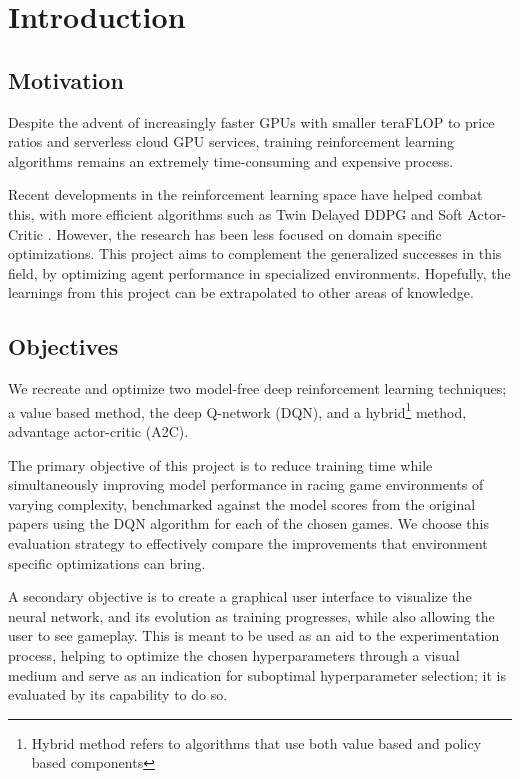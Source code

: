\chapter{Introduction}

\section{Motivation}
Despite the advent of increasingly faster GPUs with smaller teraFLOP to price
ratios and serverless cloud GPU services, training reinforcement learning
algorithms remains an extremely time-consuming and expensive process.

Recent developments in the reinforcement learning space have helped combat
this, with more efficient algorithms such as Twin Delayed DDPG
\cite{fujimoto2018addressing} and Soft Actor-Critic \cite{haarnoja2018soft}.
However, the research has been less focused on domain specific optimizations.
This project aims to complement the generalized successes in this field, by
optimizing agent performance in specialized environments. Hopefully, the
learnings from this project can be extrapolated to other areas of knowledge.

\section{Objectives}

We recreate and optimize two model-free deep reinforcement learning techniques;
a value based method, the deep Q-network (DQN), and a hybrid\footnote{Hybrid
  method refers to algorithms that use both value based and policy based
  components} method, advantage actor-critic (A2C).

The primary objective of this project is to reduce training time while
simultaneously improving model performance in racing game environments of
varying complexity, benchmarked against the model scores from the original
papers using the DQN algorithm for each of the chosen games. We choose this
evaluation strategy to effectively compare the improvements that environment
specific optimizations can bring.

A secondary objective is to create a graphical user interface to visualize the
neural network, and its evolution as training progresses, while also allowing
the user to see gameplay. This is meant to be used as an aid to the
experimentation process, helping to optimize the chosen hyperparameters through
a visual medium and serve as an indication for suboptimal hyperparameter
selection; it is evaluated by its capability to do so.

